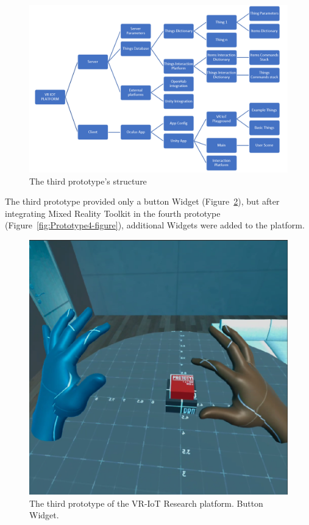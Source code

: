 \begin{figure}
  \centering
  \includegraphics[width=0.9\linewidth]{figures/Prototype3Structure.png}
  \caption{The third prototype's structure}
  \label{fig:Prototype3Structure-figure}
\end{figure}

The third prototype provided only a button Widget (Figure~\ref{fig:Prototype3-figure}), but after integrating Mixed Reality Toolkit in the fourth prototype (Figure~\ref{fig:Prototype4-figure}), additional Widgets were added to the platform. 

\begin{figure}
  \centering
  \includegraphics[width=0.6\linewidth]{figures/Prototype3.png}
  \caption{The third prototype of the VR-IoT Research platform. Button Widget.}
  \label{fig:Prototype3-figure}
\end{figure}

